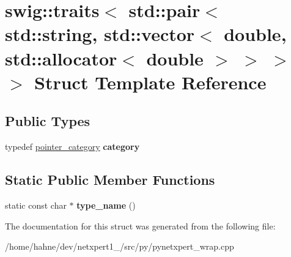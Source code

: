 \hypertarget{structswig_1_1traits_3_01std_1_1pair_3_01std_1_1string_00_01std_1_1vector_3_01double_00_01std_1_b8c4139328efdd2570530fc29a0a5b14}{}\section{swig\+:\+:traits$<$ std\+:\+:pair$<$ std\+:\+:string, std\+:\+:vector$<$ double, std\+:\+:allocator$<$ double $>$ $>$ $>$ $>$ Struct Template Reference}
\label{structswig_1_1traits_3_01std_1_1pair_3_01std_1_1string_00_01std_1_1vector_3_01double_00_01std_1_b8c4139328efdd2570530fc29a0a5b14}
\subsection*{Public Types}
\begin{DoxyCompactItemize}
\item 
typedef \hyperlink{structswig_1_1pointer__category}{pointer\+\_\+category} {\bfseries category}\hypertarget{structswig_1_1traits_3_01std_1_1pair_3_01std_1_1string_00_01std_1_1vector_3_01double_00_01std_1_b8c4139328efdd2570530fc29a0a5b14_a5beadd7b17c07438f5c0fe9a0f99fa4d}{}\label{structswig_1_1traits_3_01std_1_1pair_3_01std_1_1string_00_01std_1_1vector_3_01double_00_01std_1_b8c4139328efdd2570530fc29a0a5b14_a5beadd7b17c07438f5c0fe9a0f99fa4d}

\end{DoxyCompactItemize}
\subsection*{Static Public Member Functions}
\begin{DoxyCompactItemize}
\item 
static const char $\ast$ {\bfseries type\+\_\+name} ()\hypertarget{structswig_1_1traits_3_01std_1_1pair_3_01std_1_1string_00_01std_1_1vector_3_01double_00_01std_1_b8c4139328efdd2570530fc29a0a5b14_ae55c6cbc9663e21cb35bbf5fe9fd7a34}{}\label{structswig_1_1traits_3_01std_1_1pair_3_01std_1_1string_00_01std_1_1vector_3_01double_00_01std_1_b8c4139328efdd2570530fc29a0a5b14_ae55c6cbc9663e21cb35bbf5fe9fd7a34}

\end{DoxyCompactItemize}


The documentation for this struct was generated from the following file\+:\begin{DoxyCompactItemize}
\item 
/home/hahne/dev/netxpert1\+\_/src/py/pynetxpert\+\_\+wrap.\+cpp\end{DoxyCompactItemize}
